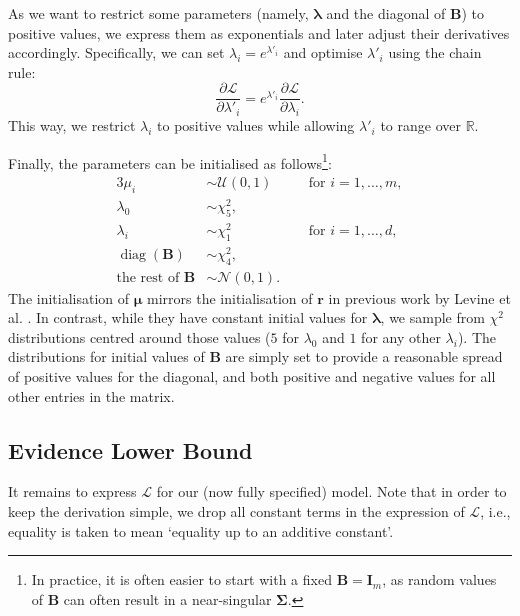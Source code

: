 \documentclass{mpaper}
\DeclareMathOperator{\diag}{diag}
\begin{document}
As we want to restrict some parameters (namely, $\bm\lambda$ and the diagonal of
$\mathbf{B}$) to positive values, we express them as exponentials and later
adjust their derivatives accordingly. Specifically, we can set $\lambda_i =
e^{\lambda'_i}$ and optimise $\lambda'_i$ using the chain rule:
\begin{equation} \label{eq:transformation}
  \frac{\partial \mathcal{L}}{\partial \lambda'_i} = e^{\lambda'_i}
  \frac{\partial \mathcal{L}}{\partial \lambda_i}.
\end{equation}
This way, we restrict $\lambda_i$ to positive values while allowing $\lambda'_i$
to range over $\mathbb{R}$.

Finally, the parameters can be initialised as follows\footnote{In practice, it
  is often easier to start with a fixed $\mathbf{B} = \mathbf{I}_m$, as random
  values of $\mathbf{B}$ can often result in a near-singular $\bm\Sigma$.}:
\begin{alignat}{3}
  \mu_i &\sim \mathcal{U}(0, 1) \quad &&\text{for } i = 1, \dots, m, \label{eq:first_initialisation} \\
  \lambda_0 &\sim \chi^2_5, && \\
  \lambda_i &\sim \chi^2_1 \quad &&\text{for } i = 1, \dots, d, \\
  \diag(\mathbf{B}) &\sim \chi^2_4, && \\
  \text{the rest of } \mathbf{B} &\sim \mathcal{N}(0, 1). \label{eq:last_initialisation} &&
\end{alignat}
The initialisation of $\bm\mu$ mirrors the initialisation of $\mathbf{r}$ in
previous work by Levine et al. \cite{DBLP:conf/nips/LevinePK11}. In contrast,
while they have constant initial values for $\bm\lambda$, we sample from
$\chi^2$ distributions centred around those values ($5$ for $\lambda_0$ and $1$
for any other $\lambda_i$). The distributions for initial values of $\mathbf{B}$
are simply set to provide a reasonable spread of positive values for the
diagonal, and both positive and negative values for all other entries in the
matrix.

\subsection{Evidence Lower Bound} \label{sec:elbo}

It remains to express $\mathcal{L}$ for our (now fully specified) model. Note
that in order to keep the derivation simple, we drop all constant terms in the
expression of $\mathcal{L}$, i.e., equality is taken to mean `equality up to an
additive constant'.
\end{document}
